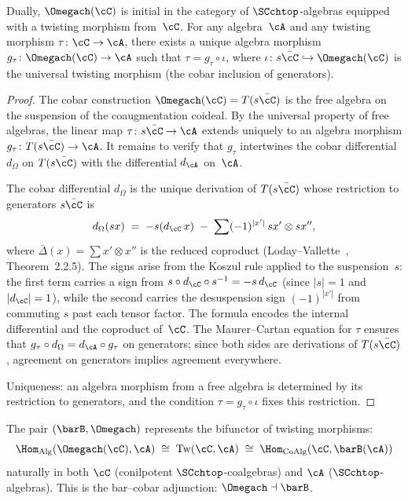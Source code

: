 \begin{theorem}
\label{thm:cobar-initiality}
Dually, $\Omegach(\cC)$ is initial in the category of
$\SCchtop$-algebras equipped with a twisting morphism from~$\cC$.
For any algebra~$\cA$ and any twisting morphism
$\tau\colon \cC \to \cA$, there exists a unique algebra morphism
$g_\tau\colon \Omegach(\cC) \to \cA$ such that
$\tau = g_\tau \circ \iota$, where
$\iota\colon s\bar{\cC} \hookrightarrow \Omegach(\cC)$ is the
universal twisting morphism \textup{(}the cobar inclusion of
generators\textup{)}.
\end{theorem}

\begin{proof}
The cobar construction $\Omegach(\cC) = T(s\bar{\cC})$ is the free
algebra on the suspension of the coaugmentation coideal. By the
universal property of free algebras, the linear map
$\tau\colon s\bar{\cC} \to \cA$ extends uniquely to an algebra
morphism $g_\tau\colon T(s\bar{\cC}) \to \cA$. It remains to
verify that $g_\tau$ intertwines the cobar differential
$d_\Omega$ on $T(s\bar{\cC})$ with the differential $d_\cA$
on~$\cA$.

The cobar differential $d_\Omega$ is the unique derivation of
$T(s\bar{\cC})$ whose restriction to generators $s\bar{\cC}$ is
\[
d_\Omega(sx)
\;=\;
-s(d_\cC\, x)
\;-\;
\sum (-1)^{|x'|}\, sx' \otimes sx'',
\]
where $\bar\Delta(x) = \sum x' \otimes x''$ is the reduced
coproduct (Loday--Vallette~\cite{LV12}, Theorem~2.2.5). The
signs arise from the Koszul rule applied to the suspension~$s$:
the first term carries a sign from $s \circ d_\cC \circ s^{-1}
= -s\, d_\cC$ (since $|s|=1$ and $|d_\cC|=1$), while the
second carries the desuspension sign $(-1)^{|x'|}$ from
commuting $s$ past each tensor factor. The formula encodes
the internal differential and the coproduct of~$\cC$.
The Maurer--Cartan equation for $\tau$ ensures that
$g_\tau \circ d_\Omega = d_\cA \circ g_\tau$ on generators; since
both sides are derivations of $T(s\bar{\cC})$, agreement on
generators implies agreement everywhere.

Uniqueness: an algebra morphism from a free algebra is determined
by its restriction to generators, and the condition
$\tau = g_\tau \circ \iota$ fixes this restriction.
\end{proof}

\begin{corollary}
\label{cor:bar-cobar-representability}
The pair $(\barB, \Omegach)$ represents the bifunctor of twisting
morphisms:
\begin{equation}\label{eq:bar-cobar-representability}
\Hom_{\mathrm{Alg}}(\Omegach(\cC), \cA)
\;\cong\;
\mathrm{Tw}(\cC, \cA)
\;\cong\;
\Hom_{\mathrm{CoAlg}}(\cC, \barB(\cA))
\end{equation}
naturally in both\/ $\cC$ \textup{(}conilpotent
$\SCchtop$-coalgebras\textup{)} and\/ $\cA$
\textup{(}$\SCchtop$-algebras\textup{)}. This is the bar--cobar
adjunction: $\Omegach \dashv \barB$.
\end{corollary}

